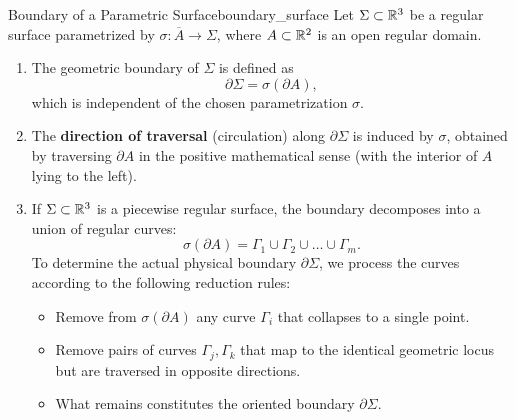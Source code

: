 \begin{definition}{Boundary of a Parametric Surface}{boundary_surface}
Let $\Sigma \subset \mathbb{R}^3$ be a regular surface parametrized by $\sigma \colon \overline{A} \to \Sigma$, where $A \subset \mathbb{R}^2$ is an open regular domain.
\begin{enumerate}[label=\arabic*)]
    \item The geometric boundary of $\Sigma$ is defined as
    \begin{equation}
        \partial \Sigma = \sigma(\partial A),
    \end{equation}
    which is independent of the chosen parametrization $\sigma$.
    
    \item The \textbf{direction of traversal} (circulation) along $\partial \Sigma$ is induced by $\sigma$, obtained by traversing $\partial A$ in the positive mathematical sense (with the interior of $A$ lying to the left).
    
    \item If $\Sigma \subset \mathbb{R}^3$ is a piecewise regular surface, the boundary decomposes into a union of regular curves:
    \begin{equation}
        \sigma(\partial A) = \Gamma_1 \cup \Gamma_2 \cup \dots \cup \Gamma_m.
    \end{equation}
    To determine the actual physical boundary $\partial \Sigma$, we process the curves according to the following reduction rules:
    \begin{itemize}
        \item Remove from $\sigma(\partial A)$ any curve $\Gamma_i$ that collapses to a single point.
        \item Remove pairs of curves $\Gamma_j, \Gamma_k$ that map to the identical geometric locus but are traversed in opposite directions.
        \item What remains constitutes the oriented boundary $\partial \Sigma$.
    \end{itemize}
\end{enumerate}
\end{definition}

